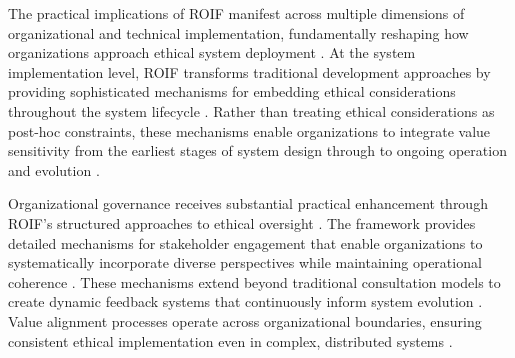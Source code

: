 \documentclass[12pt]{article}
\begin{document}
The practical implications of ROIF manifest across multiple dimensions of organizational and technical implementation, fundamentally reshaping how organizations approach ethical system deployment \parencite{dignum2019}. At the system implementation level, ROIF transforms traditional development approaches by providing sophisticated mechanisms for embedding ethical considerations throughout the system lifecycle \parencite{friedman2008}. Rather than treating ethical considerations as post-hoc constraints, these mechanisms enable organizations to integrate value sensitivity from the earliest stages of system design through to ongoing operation and evolution \parencite{vandenhoven2013}.

Organizational governance receives substantial practical enhancement through ROIF's structured approaches to ethical oversight \parencite{mitchell1997}. The framework provides detailed mechanisms for stakeholder engagement that enable organizations to systematically incorporate diverse perspectives while maintaining operational coherence \parencite{freeman2010}. These mechanisms extend beyond traditional consultation models to create dynamic feedback systems that continuously inform system evolution \parencite{wenger1998}. Value alignment processes operate across organizational boundaries, ensuring consistent ethical implementation even in complex, distributed systems \parencite{nonaka1995}.

\printbibliography
\end{document}
